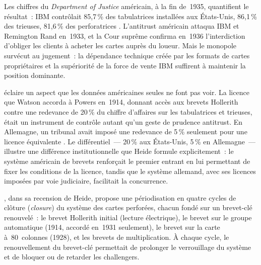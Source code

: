 Les chiffres du \emph{Department of Justice} américain, à la fin de~1935, quantifient le résultat~: IBM contrôlait 85,7\,\% des tabulatrices installées aux États-Unis, 86,1\,\% des trieuses, 81,6\,\% des perforatrices \parencite{cortada_before_1993}. L'antitrust américain attaqua IBM et Remington Rand en~1933, et la Cour suprême confirma en~1936 l'interdiction d'obliger les clients à acheter les cartes auprès du loueur. Mais le monopole survécut au jugement~: la dépendance technique créée par les formats de cartes propriétaires et la supériorité de la force de vente IBM suffirent à maintenir la position dominante.

%
\textcite{heide_punched_2009} éclaire un aspect que les données américaines seules ne font pas voir. La licence que Watson accorda à Powers en~1914, donnant accès aux brevets Hollerith contre une redevance de 20\,\% du chiffre d'affaires sur les tabulatrices et trieuses, était un instrument de contrôle autant qu'un geste de prudence antitrust. En Allemagne, un tribunal avait imposé une redevance de 5\,\% seulement pour une licence équivalente \parencite{heide_punched_2009}. Le différentiel~--- 20\,\% aux États-Unis, 5\,\% en Allemagne~--- illustre une différence institutionnelle que Heide formule explicitement~: le système américain de brevets renforçait le premier entrant en lui permettant de fixer les conditions de la licence, tandis que le système allemand, avec ses licences imposées par voie judiciaire, facilitait la concurrence.

\textcite{mounier-kuhn_punched_2015}, dans sa recension de Heide, propose une périodisation en quatre cycles de clôture (\emph{closure}) du système des cartes perforées, chacun fondé sur un brevet-clé renouvelé~: le brevet Hollerith initial (lecture électrique), le brevet sur le groupe automatique (1914, accordé en~1931 seulement), le brevet sur la carte à~80~colonnes (1928), et les brevets de multiplication. À chaque cycle, le renouvellement du brevet-clé permettait de prolonger le verrouillage du système et de bloquer ou de retarder les challengers.


